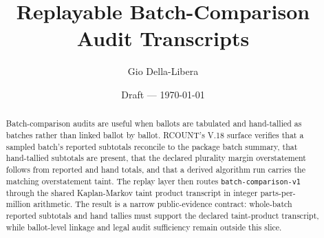 \documentclass[12pt]{article}
\title{Replayable Batch-Comparison Audit Transcripts}
\author{Gio Della-Libera}
\date{Draft --- \today}
\begin{document}
\maketitle

\begin{abstract}
Batch-comparison audits are useful when ballots are tabulated and hand-tallied
as batches rather than linked ballot by ballot. RCOUNT's V.18 surface verifies
that a sampled batch's reported subtotals reconcile to the package batch
summary, that hand-tallied subtotals are present, that the declared plurality
margin overstatement follows from reported and hand totals, and that a derived
algorithm run carries the matching overstatement taint. The replay layer then
routes \texttt{batch-comparison-v1} through the shared Kaplan-Markov taint
product transcript in integer parts-per-million arithmetic. The result is a
narrow public-evidence contract: whole-batch reported subtotals and hand tallies
must support the declared taint-product transcript, while ballot-level linkage
and legal audit sufficiency remain outside this slice.
\end{abstract}








\nocite{rcount-overview-2026,rcount-v18-2026}


\end{document}
